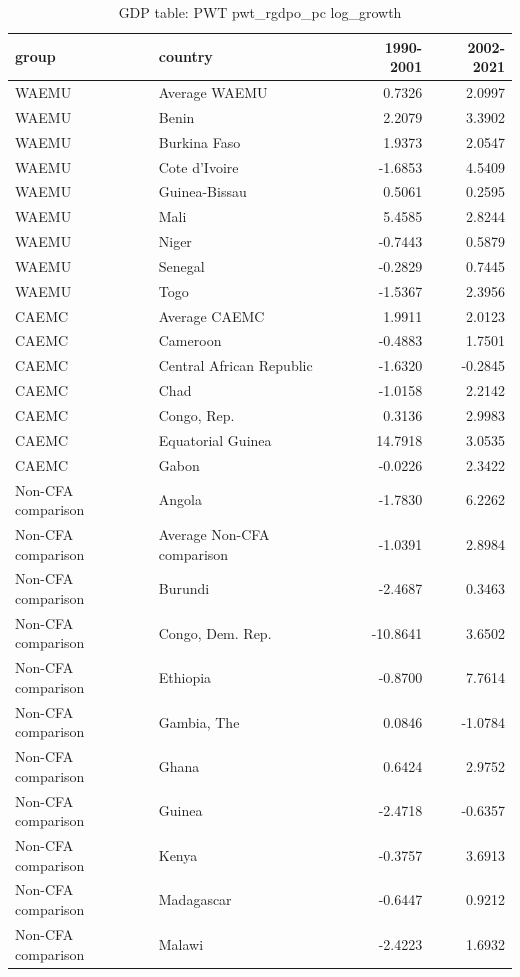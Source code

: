 \begin{table}

\caption{GDP table: PWT pwt_rgdpo_pc log_growth}
\centering
\begin{tabular}[t]{llrr}
\toprule
group & country & 1990-2001 & 2002-2021\\
\midrule
WAEMU & Average WAEMU & 0.7326 & 2.0997\\
WAEMU & Benin & 2.2079 & 3.3902\\
WAEMU & Burkina Faso & 1.9373 & 2.0547\\
WAEMU & Cote d'Ivoire & -1.6853 & 4.5409\\
WAEMU & Guinea-Bissau & 0.5061 & 0.2595\\
\addlinespace
WAEMU & Mali & 5.4585 & 2.8244\\
WAEMU & Niger & -0.7443 & 0.5879\\
WAEMU & Senegal & -0.2829 & 0.7445\\
WAEMU & Togo & -1.5367 & 2.3956\\
CAEMC & Average CAEMC & 1.9911 & 2.0123\\
\addlinespace
CAEMC & Cameroon & -0.4883 & 1.7501\\
CAEMC & Central African Republic & -1.6320 & -0.2845\\
CAEMC & Chad & -1.0158 & 2.2142\\
CAEMC & Congo, Rep. & 0.3136 & 2.9983\\
CAEMC & Equatorial Guinea & 14.7918 & 3.0535\\
\addlinespace
CAEMC & Gabon & -0.0226 & 2.3422\\
Non-CFA comparison & Angola & -1.7830 & 6.2262\\
Non-CFA comparison & Average Non-CFA comparison & -1.0391 & 2.8984\\
Non-CFA comparison & Burundi & -2.4687 & 0.3463\\
Non-CFA comparison & Congo, Dem. Rep. & -10.8641 & 3.6502\\
\addlinespace
Non-CFA comparison & Ethiopia & -0.8700 & 7.7614\\
Non-CFA comparison & Gambia, The & 0.0846 & -1.0784\\
Non-CFA comparison & Ghana & 0.6424 & 2.9752\\
Non-CFA comparison & Guinea & -2.4718 & -0.6357\\
Non-CFA comparison & Kenya & -0.3757 & 3.6913\\
\addlinespace
Non-CFA comparison & Madagascar & -0.6447 & 0.9212\\
Non-CFA comparison & Malawi & -2.4223 & 1.6932\\

\end{tabular}
\end{table}

